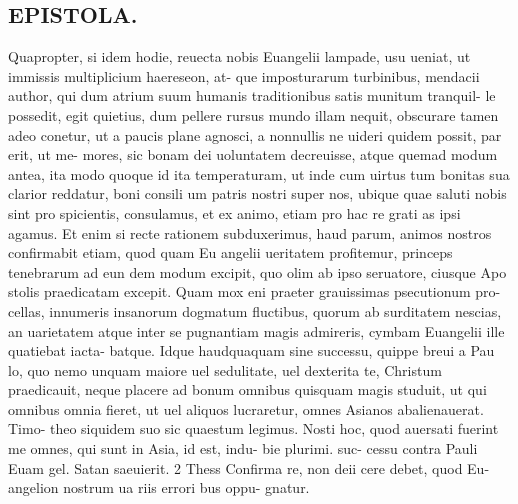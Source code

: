 \documentclass{article}
\begin{document}
\begin{pages}
\section*{EPISTOLA. }\pstart Quapropter, si idem hodie, reuecta nobis Euangelii lampade, usu ueniat, ut immissis multiplicium haereseon, at- que imposturarum turbinibus, mendacii author, qui dum atrium suum humanis traditionibus satis munitum tranquil- le possedit, egit quietius, dum pellere rursus mundo illam nequit, obscurare tamen adeo conetur, ut a paucis plane agnosci, a nonnullis ne uideri quidem possit, par erit, ut me- mores, sic bonam dei uoluntatem decreuisse, atque quemad modum antea, ita modo quoque id ita temperaturam, ut inde cum uirtus tum bonitas sua clarior reddatur, boni consili um patris nostri super nos, ubique quae saluti nobis sint pro spicientis, consulamus, et ex animo, etiam pro hac re grati as ipsi agamus. Et enim si recte rationem subduxerimus, haud parum, animos nostros confirmabit etiam, quod quam Eu angelii ueritatem profitemur, princeps tenebrarum ad eun dem modum excipit, quo olim ab ipso seruatore, ciusque Apo stolis praedicatam excepit.  \pend\pstart Quam mox eni praeter grauissimas psecutionum pro- cellas, innumeris insanorum dogmatum fluctibus, quorum ab surditatem nescias, an uarietatem atque inter se pugnantiam magis admireris, cymbam Euangelii ille quatiebat iacta- batque. Idque haudquaquam sine successu, quippe breui a Pau lo, quo nemo unquam maiore uel sedulitate, uel dexterita te, Christum praedicauit, neque placere ad bonum omnibus quisquam magis studuit, ut qui omnibus   omnia fieret, ut uel aliquos lucraretur, omnes Asianos abalienauerat. Timo- theo siquidem suo sic quaestum legimus. Nosti hoc, quod auersati fuerint me omnes, qui sunt in Asia, id est, indu- bie plurimi.   \pendQuo suc- cessu contra Pauli Euam gel. Satan saeuierit.  2 Thess Confirma re, non deii cere debet, quod Eu- angelion nostrum ua riis errori bus oppu- gnatur. 

\end{pages}
\end{document}
